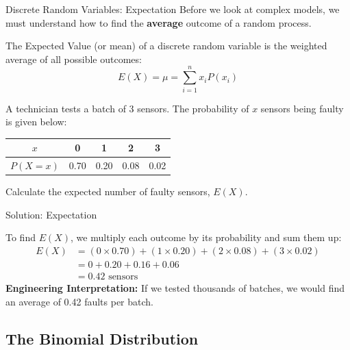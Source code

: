 \begin{frame}[allowframebreaks]{Discrete Random Variables: Expectation}
    Before we look at complex models, we must understand how to find the \textbf{average} outcome of a random process.
    
    \begin{definition}
        The Expected Value (or mean) of a discrete random variable is the weighted average of all possible outcomes:
        \[ E(X) = \mu = \sum_{i=1}^{n} x_i P(x_i) \]
    \end{definition}

    \begin{example}
        A technician tests a batch of 3 sensors. The probability of $x$ sensors being faulty is given below:
        \begin{center}
        \begin{tabular}{|c|c|c|c|c|}
        \hline
        $x$ & 0 & 1 & 2 & 3 \\ \hline
        $P(X=x)$ & 0.70 & 0.20 & 0.08 & 0.02 \\ \hline
        \end{tabular}
        \end{center}
        Calculate the expected number of faulty sensors, $E(X)$.
    \end{example}
\end{frame}

\begin{frame}{Solution: Expectation}
    \begin{solution}
        To find $E(X)$, we multiply each outcome by its probability and sum them up:
        \begin{align*}
            E(X) &= (0 \times 0.70) + (1 \times 0.20) + (2 \times 0.08) + (3 \times 0.02) \\
                 &= 0 + 0.20 + 0.16 + 0.06 \\
                 &= \mathbf{0.42} \text{ sensors}
        \end{align*}
        \textbf{Engineering Interpretation:} If we tested thousands of batches, we would find an average of 0.42 faults per batch.
    \end{solution}
\end{frame}

\subsection{The Binomial Distribution}

